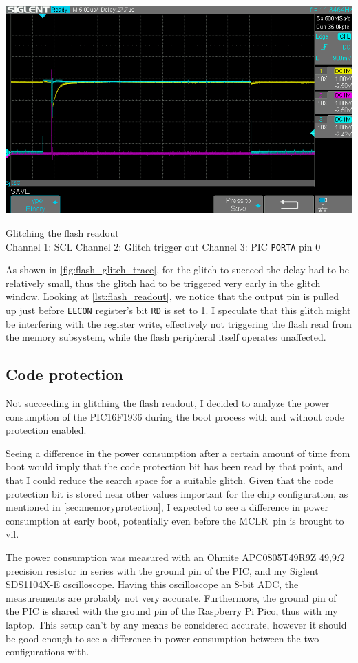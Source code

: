\documentclass[a4paper,english,twoside,10pt]{article}
\newcommand{\mclr}{\(\overline{\mbox{MCLR}}\)\ }
\begin{document}
\begin{center}
	\captionsetup{type=figure}
	\includegraphics[width=.75\textwidth]{flash_glitches/scope_trace.png}
	\caption{Glitching the flash readout\\Channel 1: SCL \quad Channel 2: Glitch trigger out \quad Channel 3: PIC \texttt{PORTA} pin 0}
	\label{fig:flash_glitch_trace}
\end{center}

As shown in \autoref{fig:flash_glitch_trace}, for the glitch to succeed the delay had to be relatively small, thus the glitch had to be triggered very early in the glitch window. Looking at \autoref{lst:flash_readout}, we notice that the output pin is pulled up just before \texttt{EECON} register's bit \texttt{RD} is set to 1. I speculate that this glitch might be interfering with the register write, effectively not triggering the flash read from the memory subsystem, while the flash peripheral itself operates unaffected.

\subsection{Code protection}
Not succeeding in glitching the flash readout, I decided to analyze the power consumption of the PIC16F1936 during the boot process with and without code protection enabled.

Seeing a difference in the power consumption after a certain amount of time from boot would imply that the code protection bit has been read by that point, and that I could reduce the search space for a suitable glitch. Given that the code protection bit is stored near other values important for the chip configuration, as mentioned in \autoref{sec:memoryprotection}, I expected to see a difference in power consumption at early boot, potentially even before the \mclr pin is brought to \gls{vil}.

The power consumption was measured with an Ohmite APC0805T49R9Z 49,9$\Omega$ precision resistor in series with the ground pin of the PIC, and my Siglent SDS1104X-E oscilloscope. Having this oscilloscope an 8-bit ADC, the measurements are probably not very accurate. Furthermore, the ground pin of the PIC is shared with the ground pin of the Raspberry Pi Pico, thus with my laptop. This setup can't by any means be considered accurate, however it should be good enough to see a difference in power consumption between the two configurations with.
\end{document}
